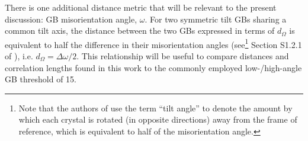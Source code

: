 \documentclass[final,twocolumn,12pt]{elsarticle}
\begin{document}
    There is one additional distance metric that will be relevant to the present discussion: GB misorientation angle, $\omega$. For two symmetric tilt GBs sharing a common tilt axis, the distance between the two GBs expressed in terms of $d_{\Omega}$ is equivalent to half the difference in their misorientation angles (see\footnote{Note that the authors of \cite{francisGeodesicOctonionMetric2019} use the term ``tilt angle'' to denote the amount by which each crystal is rotated (in opposite directions) away from the frame of reference, which is equivalent to half of the misorientation angle.} Section S1.2.1 of \cite{francisGeodesicOctonionMetric2019}), i.e. $d_{\Omega} = \Delta\omega/2$. This relationship will be useful to compare distances and correlation lengths found in this work to the commonly employed low-/high-angle GB threshold of \SI{15}{\misodeg}.
	
	

    
\end{document}
